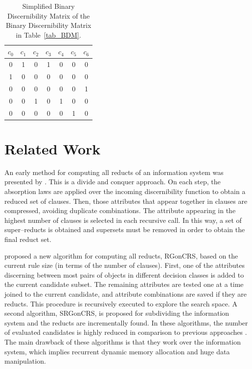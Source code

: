 \documentclass[authoryear,preprint,review,12pt]{elsarticle}
\begin{document}
     \begin{table}[htb]
		\caption{Simplified Binary Discernibility Matrix of the Binary Discernibility Matrix in Table~\ref{tab_BDM}.}
		\centering
 	\begin{tabular}{ccccccc}\label{tab:SBDM1}
            $c_0$ & $c_1$ & $c_2$ & $c_3$ & $c_4$ & $c_5$ & $c_6$\\
        		\hline
        		0&1&0&1&0&0&0\\
        		1&0&0&0&0&0&0\\
        		0&0&0&0&0&0&1\\
        		0&0&1&0&1&0&0\\
        		0&0&0&0&0&1&0\\
 	\end{tabular}             
 \end{table}  
 
 
\section{Related Work}\label{relatedWork}
  An early method for computing all reducts of an information system was presented by \cite{Starzyk99,Starzyk00}.  This is a divide and conquer approach. On each step, the absorption laws are applied over the incoming discernibility function to obtain a reduced set of clauses. Then, those attributes that appear together in  clauses are compressed, avoiding duplicate combinations. The attribute appearing in the highest number of clauses is selected in each recursive call. In this way, a set of super--reducts is obtained and supersets must be removed in order to obtain the final reduct set. 
   
  \cite{WangP07} proposed a new algorithm for computing all reducts, RGonCRS, based on the current rule size (in terms of the number of clauses). First, one of the attributes discerning between most pairs of objects in different decision classes is added to the current candidate subset. The remaining attributes are tested one at a time joined to the current candidate, and attribute combinations are saved if they are reducts. This procedure is recursively executed to explore the search space. A second algorithm, SRGonCRS, is proposed for subdividing the information system and the reducts are incrementally found. In these algorithms, the number of evaluated candidates is highly reduced in comparison to previous approaches \citep{Bazan2001,Ohrn00}. The main drawback of these algorithms is that they work over the information system, which implies recurrent dynamic memory allocation and huge data manipulation.
  
\end{document}
